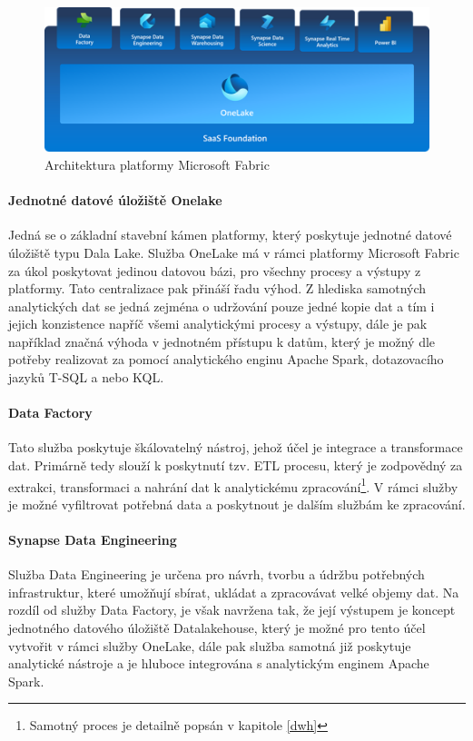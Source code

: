 \documentclass[
  digital,     %
  twoside,     %
  lof,         %
  lot,         %
]{fithesis4}
\begin{document}
\begin{figure}[h]
  \begin{center}
          \includegraphics[width=12cm]{img/fabric.png}
  \end{center}
  \caption{Architektura platformy Microsoft Fabric \parencite{Buck2023}}
  \label{fig:fabric_architecture}
\end{figure}  

\paragraph{Jednotné datové úložiště Onelake}
Jedná se o základní stavební kámen platformy, který poskytuje jednotné datové úložiště typu Dala Lake. Služba OneLake má v rámci platformy Microsoft Fabric za úkol poskytovat jedinou datovou bázi, pro všechny procesy a výstupy z platformy. Tato centralizace pak přináší řadu výhod. Z hlediska samotných analytických dat se jedná zejména o udržování pouze jedné kopie dat a tím i jejich konzistence napříč všemi analytickými procesy a výstupy, dále je pak například značná výhoda v jednotném přístupu k datům, který je možný dle potřeby realizovat za pomocí analytického enginu Apache Spark, dotazovacího jazyků T-SQL a nebo KQL.\parencite{OneLake}

\paragraph{Data Factory}
Tato služba poskytuje škálovatelný nástroj, jehož účel je integrace a transformace dat. Primárně tedy slouží k poskytnutí tzv. ETL procesu, který je zodpovědný za extrakci, transformaci a nahrání dat k analytickému zpracování\footnote{Samotný proces je detailně  popsán v kapitole \ref{dwh}}. V rámci služby je možné vyfiltrovat potřebná data a poskytnout je dalším službám ke zpracování.\parencite{DataFactory}

\paragraph{Synapse Data Engineering}
Služba Data Engineering je určena pro návrh, tvorbu a údržbu potřebných infrastruktur, které umožňují sbírat, ukládat a zpracovávat velké objemy dat. Na rozdíl od služby Data Factory, je však navržena tak, že její výstupem je koncept jednotného datového úložiště Datalakehouse, který je možné pro tento účel vytvořit v rámci služby OneLake, dále pak služba samotná již poskytuje analytické nástroje a je hluboce integrována s analytickým enginem Apache Spark.\parencite{DataEngineering}
\end{document}
